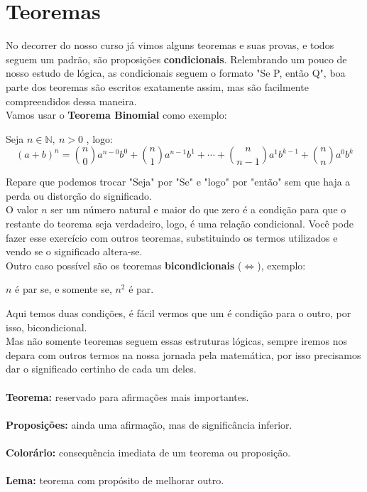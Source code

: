 \documentclass[main.tex]{subfiles}
\begin{document}
\section{Teoremas}
No decorrer do nosso curso já vimos alguns teoremas e suas provas, e todos seguem um padrão, são proposições \textbf{condicionais}. Relembrando um pouco de nosso estudo de lógica, as condicionais seguem o formato "Se P, então Q", boa parte dos teoremas são escritos exatamente assim, mas são facilmente compreendidos dessa maneira.
\\
Vamos usar o \textbf{Teorema Binomial} como exemplo:
\begin{theorem}
Seja $n \in \mathbb{N}, \ n>0$ , logo:
$$(a+b)^n = {n \choose 0}a^{n-0}b^{0} + {n \choose 1}a^{n-1}b^1 + \cdots + {n \choose n-1}a^1b^{k-1} + {n \choose n}a^{0}b^k $$
\end{theorem}
Repare que podemos trocar "Seja" por "Se" e "logo" por "então" sem que haja a perda ou distorção do significado.
\\
O valor $n$ ser um número natural e maior do que zero é a condição para que o restante do teorema seja verdadeiro, logo, é uma relação condicional. Você pode fazer esse exercício com outros teoremas, substituindo os termos utilizados e vendo se o significado altera-se.
\\
Outro caso possível são os teoremas \textbf{bicondicionais} ($\Leftrightarrow$), exemplo:
\\
\begin{theorem}
$n$ é par se, e somente se, $n^2$ é par.
\end{theorem}
Aqui temos duas condições, é fácil vermos que um é condição para o outro, por isso, bicondicional.
\\
Mas não somente teoremas seguem essas estruturas lógicas, sempre iremos nos depara com outros termos na nossa jornada pela matemática, por isso precisamos dar o significado certinho de cada um deles.
\\ \\
\textbf{Teorema:} reservado para afirmações mais importantes.
\\ \\
\textbf{Proposições:} ainda uma afirmação, mas de significância inferior.
\\ \\
\textbf{Colorário:} consequência imediata de um teorema ou proposição.
\\ \\
\textbf{Lema:} teorema com propósito de melhorar outro. 
\end{document}
